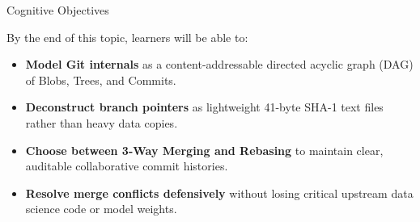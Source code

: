 \documentclass[../m00-session-04.tex]{subfiles}
\begin{document}

\begin{frame}{Cognitive Objectives}
  \begin{LearningObjectives}{By the end of this topic, learners will be able to:}
    \begin{itemize}\setlength{\itemsep}{0.28em}
      \item \textbf{Model Git internals} as a content-addressable directed acyclic graph (DAG) of Blobs, Trees, and Commits.
      \item \textbf{Deconstruct branch pointers} as lightweight 41-byte SHA-1 text files rather than heavy data copies.
      \item \textbf{Choose between 3-Way Merging and Rebasing} to maintain clear, auditable collaborative commit histories.
      \item \textbf{Resolve merge conflicts defensively} without losing critical upstream data science code or model weights.
    \end{itemize}
  \end{LearningObjectives}
\end{frame}
\end{document}
